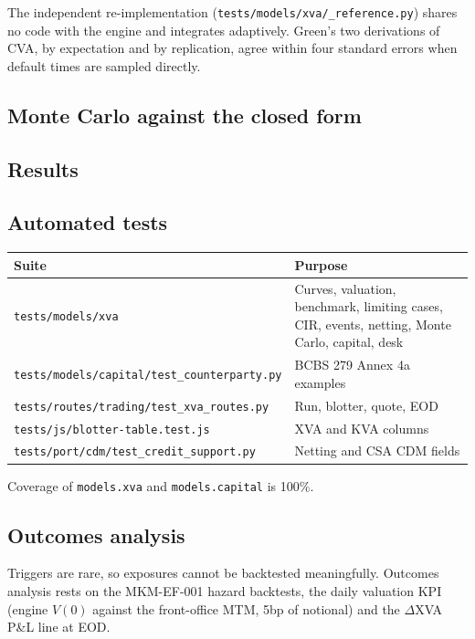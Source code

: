 \documentclass[11pt,a4paper]{article}
\begin{document}
The independent re-implementation (\texttt{tests/models/xva/\_reference.py})
shares no code with the engine and integrates adaptively. Green's two
derivations of CVA, by expectation and by replication, agree within four
standard errors when default times are sampled directly.

\subsection{Monte Carlo against the closed form}


\subsection{Results}


\subsection{Automated tests}
{\small
\begin{longtable}{p{7.6cm}p{7.2cm}}
\toprule
\textbf{Suite} & \textbf{Purpose} \\
\midrule
\texttt{tests/models/xva} & Curves, valuation, benchmark, limiting cases, CIR, events, netting, Monte Carlo, capital, desk \\
\texttt{tests/models/capital/test\_counterparty.py} & BCBS 279 Annex 4a examples \\
\texttt{tests/routes/trading/test\_xva\_routes.py} & Run, blotter, quote, EOD \\
\texttt{tests/js/blotter-table.test.js} & XVA and KVA columns \\
\texttt{tests/port/cdm/test\_credit\_support.py} & Netting and CSA CDM fields \\
\bottomrule
\end{longtable}}

\noindent Coverage of \texttt{models.xva} and \texttt{models.capital} is 100\%.

\subsection{Outcomes analysis}
Triggers are rare, so exposures cannot be backtested meaningfully. Outcomes
analysis rests on the MKM-EF-001 hazard backtests, the daily valuation KPI
(engine $V(0)$ against the front-office MTM, 5bp of notional) and the
$\Delta$XVA P\&L line at EOD.

\mkmsensitivity
\end{document}
